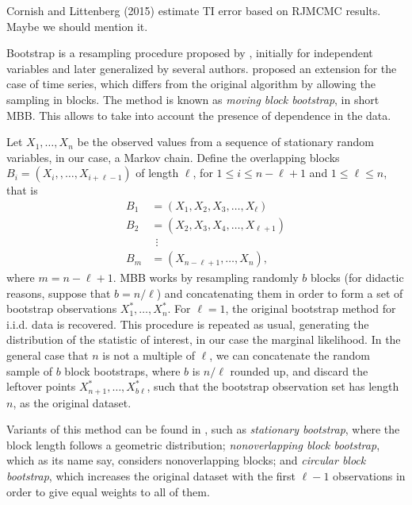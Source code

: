 \documentclass[aps,reprint,amsmath,amssymb,showpacs,showkeys]{revtex4-1}%
\newcommand{\cb}{ \color{blue}}
\begin{document}
{\cb Cornish and Littenberg (2015) \citep{Cornish:2014} estimate TI error based on RJMCMC results. Maybe we should mention it.}
	

Bootstrap is a resampling procedure proposed by \cite{Efron:1979}, initially for independent variables and later generalized by several authors.  \cite{Kunsch:1989} proposed an extension for the case of time series, which differs from the original algorithm by allowing the sampling in blocks.  The method is known as \textit{moving block bootstrap}, in short MBB.  This allows to take into account the presence of dependence in the data.

Let $X_1, \dots, X_n$ be the observed values from a sequence of stationary random variables, in our case, a Markov chain.  Define the overlapping blocks  $B_i = (X_i, ,\dots,X_{i+\ell-1})$ of length $\ell$, for $1\leq i \leq n-\ell + 1$ and $1 \leq \ell \leq n$, that is
\begin{align*}
B_1 &= (X_1, X_2, X_3, \dots, X_{\ell}) \\
B_2 &= (X_2, X_3, X_4, \dots, X_{\ell + 1}) \\
&\:\:\vdots\\
B_m &= (X_{n-\ell +1}, \dots, X_{n}), 
\end{align*} 
where $m = n - \ell +1$.  MBB works by resampling randomly $b$ blocks (for didactic reasons, suppose that $b = n/\ell$) and concatenating them in order to form a set of bootstrap observations $X^*_1,\dots,X^*_n$.  For $\ell = 1$, the original bootstrap method for i.i.d. data is recovered.  This procedure is repeated as usual, generating the distribution of the statistic of interest, in our case the marginal likelihood.  In the general case that $n$ is not a multiple of $\ell$, we can concatenate the random sample of $b$ block bootstraps, where $b$ is $n/\ell$ rounded up, and discard the leftover points $X^*_{n+1}, \dots, X^*_{b\ell}$, such that the bootstrap observation set has length $n$, as the original dataset.

Variants of this method can be found in \cite{Lahiri:2003}, such as \textit{stationary bootstrap}, where the block length follows a geometric distribution;  \textit{nonoverlapping block bootstrap}, which as its name say, considers nonoverlapping blocks; and \textit{circular block bootstrap}, which increases the original dataset with the first $\ell - 1$ observations in order to give equal weights to all of them. 
\end{document}
